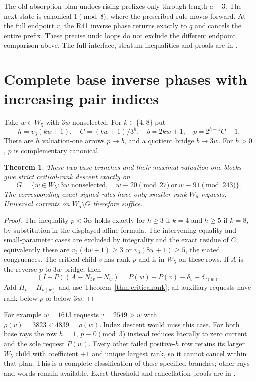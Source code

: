 \documentclass[11pt]{article}
\newtheorem{theorem}{Theorem}
\begin{document}
The old absorption plan undoes rising prefixes only through length
$a-3$. The next state is canonical $1\pmod8$, where the prescribed
rule moves forward. At the full endpoint $r$, the R41 inverse phase
returns exactly to $q$ and cancels the entire prefix. These precise
undo loops do not exclude the different endpoint comparison above.
The full interface, stratum inequalities and proofs are in
.

\section{Complete base inverse phases with increasing pair indices}
Take $w\in W_5$ with $3w$ nonselected. For $k\in\{4,8\}$ put
\[
 h=v_3(kw+1),\quad C=(kw+1)/3^h,\quad b=2kw+1,\quad
 p=2^{h+1}C-1.
\]
There are $h$ valuation-one arrows $p\to b$, and a quotient bridge
$b\to3w$. For $h>0$, $p$ is complementary canonical.

\begin{theorem}\label{thm:nonselectedphase}
These two base branches and their maximal valuation-one blocks give
strict critical-rank descent exactly on
\[
 G=\{w\in W_5:3w\text{ nonselected},\quad
 w\equiv20\pmod{27}\ \text{or}\ w\equiv91\pmod{243}\}.
\]
The corresponding exact signed rules have only smaller-rank $W_5$
requests. Universal currents on $W_5\setminus G$ therefore suffice.
\end{theorem}
\begin{proof}
The inequality $p<3w$ holds exactly for $h\ge3$ if $k=4$ and
$h\ge5$ if $k=8$, by substitution in the displayed affine formula.
The intervening equality and small-parameter cases are excluded by
integrality and the exact residue of $C$; equivalently these are
$v_3(4w+1)\ge3$ or $v_3(8w+1)\ge5$, the stated congruences.
The critical child $v$ has rank $p$ and is in $W_5$ on these rows.
If $A$ is the reverse $p$-to-$3w$ bridge, then
\[
 (I-P)(A-N_{3v}-N_w)=P(w)-P(v)-\delta_v+\delta_{\nu(w)}.
\]
Add $H_v-H_{\nu(w)}$ and use Theorem~\ref{thm:criticalrank}; all
auxiliary requests have rank below $p$ or below $3w$.
\end{proof}

For example $w=1613$ requests $v=2549>w$ with
$\rho(v)=3823<4839=\rho(w)$. Index descent would miss this case.
For both base rays the row $h=1$, $p\equiv0\pmod3$ instead reduces
literally to zero current and the sole request $P(w)$. Every other
failed positive-$h$ row retains its larger $W_5$ child with coefficient
$+1$ and unique largest rank, so it cannot cancel within that plan.
This is a complete classification of these specified branches; other
rays and words remain available. Exact threshold and cancellation proofs
are in
.
\end{document}
